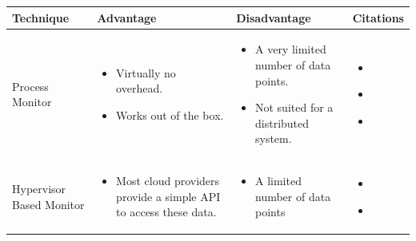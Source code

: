 \begin{longtable}{| p{23mm} | p{40mm} | p{40mm} | p{40mm} |}
\hline
    \textbf{Technique} &
    \textbf{Advantage} &
    \textbf{Disadvantage} &
    \textbf{Citations} \\ \hline

    Process Monitor &
    \vspace{-8mm}
    \begin{itemize}[leftmargin=0mm,noitemsep,nolistsep,label={}] 
        \item Virtually no overhead.
        \item Works out of the box.
        \vspace{-7mm}
    \end{itemize} &
    \vspace{-8mm}
    \begin{itemize}[leftmargin=0mm,noitemsep,nolistsep,label={}] 
        \item A very limited number of data points.
        \item     Not suited for a distributed system.
        \vspace{-7mm}
    \end{itemize} &
    \vspace{-8mm}
    \begin{itemize}[leftmargin=0mm,noitemsep,nolistsep,label={}] 
        \item \cite{chigurupati2017root}
        \item \cite{kumarage2018anomaly}
        \item \cite{kumarage2019generative}
        \vspace{-7mm}
    \end{itemize} \\ \hline

    Hypervisor Based Monitor &
    \vspace{-8mm}
    \begin{itemize}[leftmargin=0mm,noitemsep,nolistsep,label={}] 
        \item Most cloud providers provide a simple API to access these data.
        \vspace{-7mm}
    \end{itemize} &
    \vspace{-8mm}
    \begin{itemize}[leftmargin=0mm,noitemsep,nolistsep,label={}] 
        \item A limited number of data points
        \vspace{-7mm}
    \end{itemize} &
    \vspace{-8mm}
    \begin{itemize}[leftmargin=0mm,noitemsep,nolistsep,label={}] 
        \item \cite{du2018anomaly}
        \item \cite{geethika2019anomaly}
        \vspace{-7mm}
    \end{itemize} \\ \hline
    

\end{longtable}
